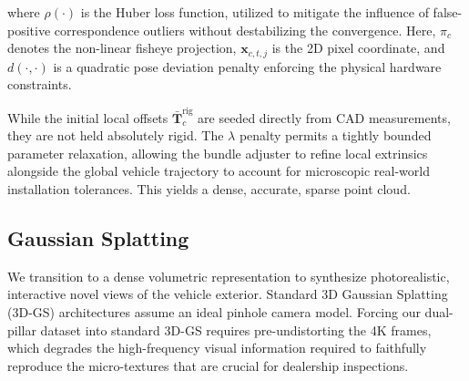 \documentclass[letterpaper, 10 pt, conference]{ieeeconf}  %
\begin{document}
where $\rho(\cdot)$ is the Huber loss function, utilized to mitigate the influence of false-positive correspondence outliers without destabilizing the convergence. Here, $\pi_c$ denotes the non-linear fisheye projection, $\mathbf{x}_{c,t,j}$ is the 2D pixel coordinate, and $d(\cdot, \cdot)$ is a quadratic pose deviation penalty enforcing the physical hardware constraints.


While the initial local offsets $\bar{\mathbf{T}}^{\text{rig}}_{c}$ are seeded directly from CAD measurements, they are not held absolutely rigid. The $\lambda$ penalty permits a tightly bounded parameter relaxation, allowing the bundle adjuster to refine local extrinsics alongside the global vehicle trajectory to account for microscopic real-world installation tolerances. This yields a dense, accurate, sparse point cloud.










\subsection{Gaussian Splatting}
\label{subsec:methodology_gaussian_splatting}






We transition to a dense volumetric representation to synthesize photorealistic, interactive novel views of the vehicle exterior. Standard 3D Gaussian Splatting (3D-GS) architectures assume an ideal pinhole camera model. Forcing our dual-pillar dataset into standard 3D-GS requires pre-undistorting the 4K frames, which degrades the high-frequency visual information required to faithfully reproduce the micro-textures that are crucial for dealership inspections.
\end{document}
